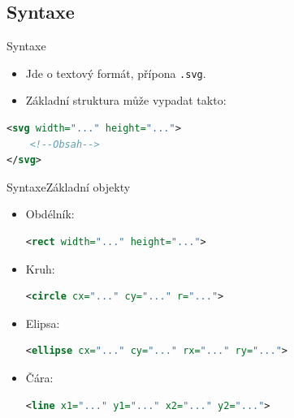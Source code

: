 \subsection{Syntaxe}
\begin{frame}[t,fragile]{Syntaxe}
    \begin{itemize}
        \item Jde o textový formát, přípona \texttt{.svg}.
        \item Základní struktura může vypadat takto:
    \end{itemize}
    \begin{lstlisting}[language=XML]
<svg width="..." height="...">
    <!--Obsah-->
</svg>
    \end{lstlisting}
\end{frame}

\begin{frame}[t,fragile]{Syntaxe}{Základní objekty}
    \begin{itemize}
        \item Obdélník:
        \begin{lstlisting}[language=XML]
<rect width="..." height="...">
        \end{lstlisting}
        \item Kruh:
        \begin{lstlisting}[language=XML]
<circle cx="..." cy="..." r="...">
        \end{lstlisting}
        \item Elipsa:
        \begin{lstlisting}[language=XML]
<ellipse cx="..." cy="..." rx="..." ry="...">
        \end{lstlisting}
        \item Čára:
        \begin{lstlisting}[language=XML]
<line x1="..." y1="..." x2="..." y2="...">
        \end{lstlisting}
    \end{itemize}
\end{frame}